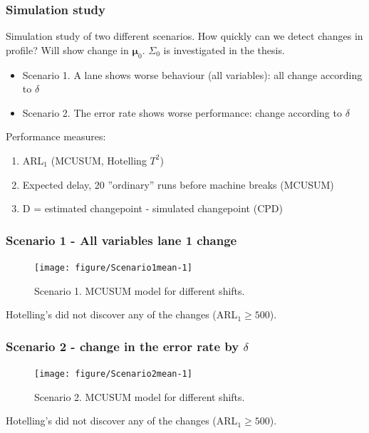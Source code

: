 \documentclass[10pt]{beamer}\usepackage[]{graphicx}\usepackage[]{color}
\newenvironment{knitrout}{}{} %
\begin{document}
 
\begin{frame}\frametitle{Simulation study}
Simulation study of two different scenarios. How quickly can we detect changes in profile? Will show change in $\boldsymbol{\mu}_0$. $\Sigma_0$ is investigated in the thesis. 
 \begin{itemize}
 \item Scenario 1. A lane shows worse behaviour (all variables): all change according to $\delta$
 \item Scenario 2. The error rate shows worse performance: change according to $\delta$
 \end{itemize}
 \pause
 Performance measures:
 \begin{enumerate}
 \item ARL$_1$ (MCUSUM, Hotelling $T^2$)
 \item Expected delay, 20 ''ordinary'' runs before machine breaks (MCUSUM)
 \item D = estimated changepoint - simulated changepoint (CPD)
 \end{enumerate}
\end{frame}





\begin{frame}\frametitle{Scenario 1 - All variables lane 1 change}
\begin{knitrout}
\color{fgcolor}\begin{figure}
\texttt{[image: figure/Scenario1mean-1]} \caption[Scenario 1]{Scenario 1. MCUSUM model for different shifts. }\label{fig:Scenario1mean}
\end{figure}


\end{knitrout}
Hotelling's did not discover any of the changes (ARL$_1\geq 500$).
\end{frame}


\begin{frame}\frametitle{Scenario 2 - change in the error rate by $\delta$}
\begin{knitrout}
\color{fgcolor}\begin{figure}
\texttt{[image: figure/Scenario2mean-1]} \caption[Scenario 2]{Scenario 2. MCUSUM model for different shifts.}\label{fig:Scenario2mean}
\end{figure}


\end{knitrout}
Hotelling's did not discover any of the changes (ARL$_1\geq 500$).
\end{frame}
\end{document}
